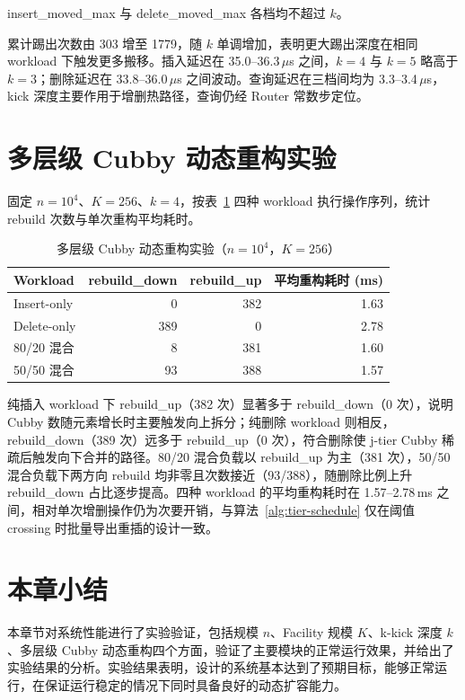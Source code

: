 \noindent insert\_moved\_max 与 delete\_moved\_max 各档均不超过 \(k\)。

累计踢出次数由 303 增至 1779，随 \(k\) 单调增加，表明更大踢出深度在相同 workload 下触发更多搬移\cite{bender2022otsh,pagh2004cuckoo}。插入延迟在 35.0--36.3\,$\mu$s 之间，\(k=4\) 与 \(k=5\) 略高于 \(k=3\)；删除延迟在 33.8--36.0\,$\mu$s 之间波动。查询延迟在三档间均为 3.3--3.4\,$\mu$s，kick 深度主要作用于增删热路径，查询仍经 Router 常数步定位\cite{bender2022otsh,bender2024sosa}。

\section{多层级 Cubby 动态重构实验}

固定 \(n=10^4\)、\(K=256\)、\(k=4\)，按表~\ref{tab:exp-tier-fixed} 四种 workload 执行操作序列，统计 rebuild 次数与单次重构平均耗时。

\begin{table}[htbp]
  \centering
  \caption{多层级 Cubby 动态重构实验（\(n=10^4\)，\(K=256\)）}
  \label{tab:exp-tier-fixed}
  \small
  \begin{tabular}{lrrr}
    \toprule
    Workload      & rebuild\_down & rebuild\_up & 平均重构耗时 (ms) \\
    \midrule
    Insert-only   & 0     & 382   & 1.63 \\
    Delete-only   & 389   & 0     & 2.78 \\
    80/20 混合    & 8     & 381   & 1.60 \\
    50/50 混合    & 93    & 388   & 1.57 \\
    \bottomrule
  \end{tabular}
\end{table}

纯插入 workload 下 rebuild\_up（382 次）显著多于 rebuild\_down（0 次），说明 Cubby 数随元素增长时主要触发向上拆分；纯删除 workload 则相反，rebuild\_down（389 次）远多于 rebuild\_up（0 次），符合删除使 j-tier Cubby 稀疏后触发向下合并的路径\cite{bender2024iceberg,pandey2023iceberght}。80/20 混合负载以 rebuild\_up 为主（381 次），50/50 混合负载下两方向 rebuild 均非零且次数接近（93/388），随删除比例上升 rebuild\_down 占比逐步提高。四种 workload 的平均重构耗时在 1.57--2.78\,ms 之间，相对单次增删操作仍为次要开销，与算法~\ref{alg:tier-schedule} 仅在阈值 crossing 时批量导出重插的设计一致。

\section{本章小结}

本章节对系统性能进行了实验验证，包括规模 \(n\)、Facility 规模 \(K\)、k-kick 深度 \(k\)、多层级 Cubby 动态重构四个方面，验证了主要模块的正常运行效果，并给出了实验结果的分析。实验结果表明，设计的系统基本达到了预期目标，能够正常运行，在保证运行稳定的情况下同时具备良好的动态扩容能力。